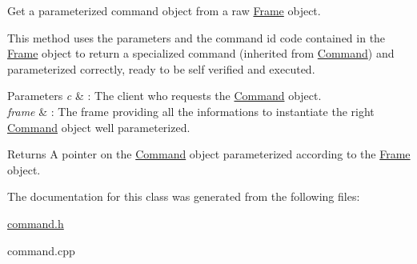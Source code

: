 Get a parameterized command object from a raw \hyperlink{class_frame}{Frame} object. 

This method uses the parameters and the command id code contained in the \hyperlink{class_frame}{Frame} object to return a specialized command (inherited from \hyperlink{class_command}{Command}) and parameterized correctly, ready to be self verified and executed.


\begin{DoxyParams}{Parameters}
{\em c} & \-: The client who requests the \hyperlink{class_command}{Command} object. \\
\hline
{\em frame} & \-: The frame providing all the informations to instantiate the right \hyperlink{class_command}{Command} object well parameterized. \\
\hline
\end{DoxyParams}
\begin{DoxyReturn}{Returns}
A pointer on the \hyperlink{class_command}{Command} object parameterized according to the \hyperlink{class_frame}{Frame} object. 
\end{DoxyReturn}


The documentation for this class was generated from the following files\-:\begin{DoxyCompactItemize}
\item 
\hyperlink{command_8h}{command.\-h}\item 
command.\-cpp\end{DoxyCompactItemize}
